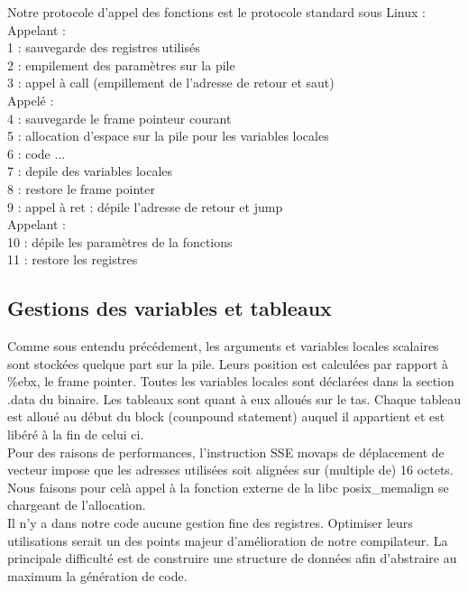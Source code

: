 \documentclass[a4paper, 11pt]{article}
\begin{document}
Notre protocole d'appel des fonctions est le protocole standard sous Linux :\\
Appelant :\\
1 : sauvegarde des registres utilisés\\
2 : empilement des paramètres sur la pile\\
3 : appel à call (empillement de l'adresse de retour et saut)\\
Appelé :\\
4 : sauvegarde le frame pointeur courant\\
5 : allocation d'espace sur la pile pour les variables locales\\
6 : code ...\\
7 : depile des variables locales\\
8 : restore le frame pointer\\
9 : appel à ret : dépile l'adresse de retour et jump\\
Appelant :\\
10 : dépile les paramètres de la fonctions\\
11 : restore les registres\\

\subsection{Gestions des variables et tableaux}

Comme sous entendu précédement, les arguments et variables locales scalaires sont stockées quelque part sur la pile. Leurs position est calculées
par rapport à \%ebx, le frame pointer.
Toutes les variables locales sont déclarées dans la section .data du binaire.
Les tableaux sont quant à eux alloués sur le tas. Chaque tableau est alloué au début du block (counpound statement) auquel il appartient et est
libéré à la fin de celui ci.\\
Pour des raisons de performances, l'instruction SSE movaps de déplacement de vecteur impose
que les adresses utilisées soit alignées sur (multiple de) 16 octets. Nous faisons pour celà appel à la fonction externe de la libc posix\_memalign
se chargeant de l'allocation.\\

Il n'y a dans notre code aucune gestion fine des registres. Optimiser leurs utilisations serait un des points majeur d'amélioration de notre
compilateur. La principale difficulté est de construire une structure de données afin d'abstraire au maximum la génération de code.
\end{document}
